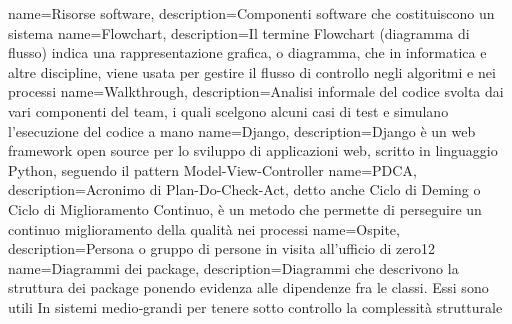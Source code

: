  {
	name=Risorse software,
	description={Componenti software che costituiscono un sistema}
}
 {
	name=Flowchart,
	description={Il termine Flowchart (diagramma di flusso) indica una rappresentazione grafica, o diagramma, che in informatica e altre discipline, viene usata per gestire il flusso di controllo negli algoritmi e nei processi}
}
 {
	name=Walkthrough,
	description={Analisi informale del codice svolta dai vari componenti del team, i quali scelgono alcuni casi di test e simulano l'esecuzione del codice a mano}
}
 {
	name=Django,
	description={Django è un web framework open source per lo sviluppo di applicazioni web, scritto in linguaggio Python, seguendo il pattern Model-View-Controller}
}
 {
	name=PDCA,
	description={Acronimo di Plan-Do-Check-Act, detto anche Ciclo di Deming o Ciclo di Miglioramento Continuo, è un metodo che permette di perseguire un continuo miglioramento della qualità nei processi}
}
 {
	name=Ospite,
	description={Persona o gruppo di persone in visita all'ufficio di zero12}
}
 {
	name=Diagrammi dei package,
	description={Diagrammi che descrivono la struttura dei package ponendo evidenza alle dipendenze fra le classi. Essi sono utili In sistemi medio‐grandi per tenere sotto controllo la complessità strutturale}
}


